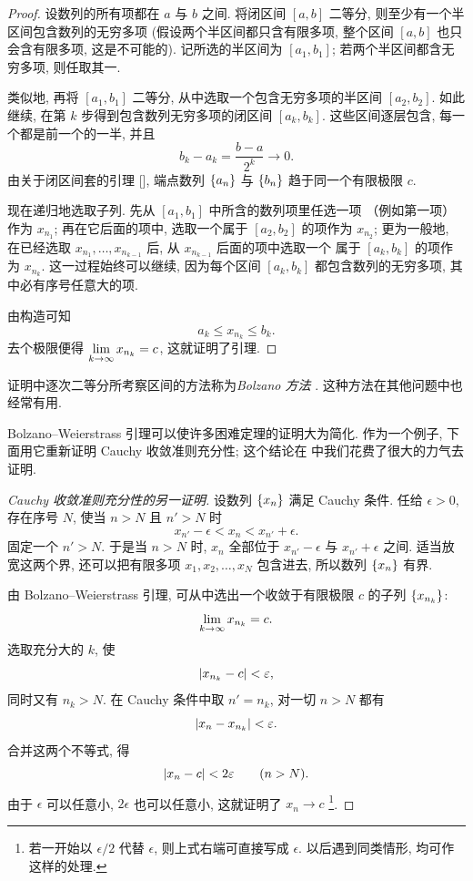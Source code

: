 \begin{proof}
设数列的所有项都在 $a$ 与 $b$ 之间. 将闭区间 $[a,b]$ 二等分,
则至少有一个半区间包含数列的无穷多项 (假设两个半区间都只含有限多项,
整个区间 $[a,b]$ 也只会含有限多项, 这是不可能的).
记所选的半区间为 $[a_1,b_1]$; 若两个半区间都含无穷多项, 则任取其一.

类似地, 再将 $[a_1,b_1]$ 二等分, 从中选取一个包含无穷多项的半区间
$[a_2,b_2]$. 如此继续, 在第 $k$ 步得到包含数列无穷多项的闭区间
$[a_k,b_k]$. 这些区间逐层包含, 每一个都是前一个的一半, 并且
$$
b_k-a_k=\frac{b-a}{2^k}\to0.
$$
由关于闭区间套的引理 [],
端点数列 $\{a_{n}\}$ 与 $\{b_{n}\}$ 趋于同一个有限极限 $c$.

现在递归地选取子列. 先从 $[a_1,b_1]$ 中所含的数列项里任选一项
（例如第一项）作为 $x_{n_1}$; 再在它后面的项中, 选取一个属于
$[a_2,b_2]$ 的项作为 $x_{n_2}$;
更为一般地, 在已经选取
$x_{n_1},\ldots,x_{n_{k-1}}$ 后, 从 $x_{n_{k-1}}$ 后面的项中选取一个
属于 $[a_k,b_k]$ 的项作为 $x_{n_k}$.
这一过程始终可以继续, 因为每个区间 $[a_k,b_k]$ 都包含数列的无穷多项,
其中必有序号任意大的项.

由构造可知
$$
a_k\leqslant x_{n_k}\leqslant b_k.
$$
去个极限便得
$
\lim\limits_{k \to \infty}x_{n_k}=c
$,
这就证明了引理.
\end{proof}

证明中逐次二等分所考察区间的方法称为\emph{Bolzano 方法}
. 这种方法在其他问题中也经常有用.

Bolzano--Weierstrass 引理可以使许多困难定理的证明大为简化.
作为一个例子, 下面用它重新证明 Cauchy 收敛准则充分性;
这个结论在  中我们花费了很大的力气去证明.

\begin{proof}[Cauchy 收敛准则充分性的另一证明]
设数列 $\{x_{n}\}$ 满足 Cauchy 条件. 任给 $\epsilon>0$,
存在序号 $N$, 使当 $n>N$ 且 $n'>N$ 时
$$
x_{n'}-\epsilon<x_n<x_{n'}+\epsilon.
$$
固定一个 $n'>N$. 于是当 $n>N$ 时, $x_n$ 全部位于
$x_{n'}-\epsilon$ 与 $x_{n'}+\epsilon$ 之间.
适当放宽这两个界, 还可以把有限多项 $x_1,x_2,\ldots,x_N$ 包含进去,
所以数列 $\{x_{n}\}$ 有界.

由 Bolzano--Weierstrass 引理, 可从中选出一个收敛于有限极限 $c$ 的子列 $\left\{ x_{n_k} \right\}$:
$$
\lim\limits_{k \to \infty}x_{n_k}=c.
$$
选取充分大的 $k$, 使
$$
\left| x_{n_k}-c \right|<\varepsilon,
$$
同时又有 $n_k>N$. 在 Cauchy 条件中取 $n'=n_k$, 对一切 $n>N$ 都有
$$
\left| x_n-x_{n_k} \right|<\varepsilon.
$$
合并这两个不等式, 得
$$
\left| x_n-c \right|<2\varepsilon\qquad(n>N).
$$
由于 $\epsilon$ 可以任意小, $2\epsilon$ 也可以任意小,
这就证明了 $x_n\to c$
\footnote{若一开始以 $\epsilon/2$ 代替 $\epsilon$,
则上式右端可直接写成 $\epsilon$.
以后遇到同类情形, 均可作这样的处理.}.
\end{proof}

